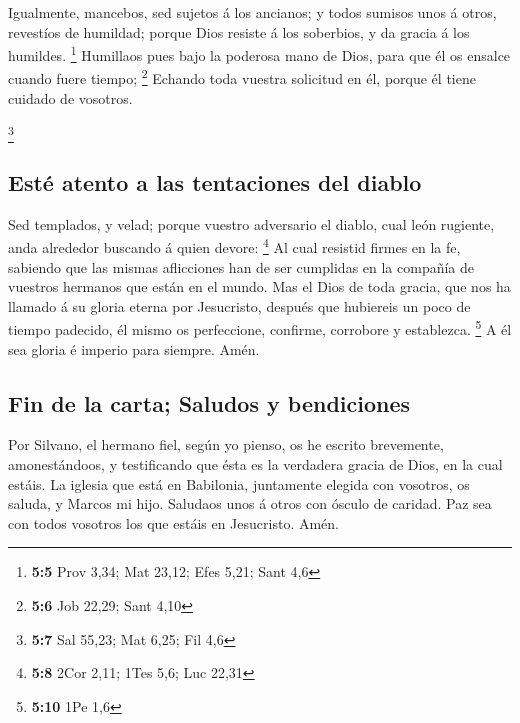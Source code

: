 Igualmente, mancebos, sed sujetos á los ancianos; y todos
sumisos unos á otros, revestíos de humildad; porque Dios resiste á los
soberbios, y da gracia á los humildes. \footnote{\textbf{5:5} Prov 3,34;
  Mat 23,12; Efes 5,21; Sant 4,6}  Humillaos pues bajo la
poderosa mano de Dios, para que él os ensalce cuando fuere tiempo;
\footnote{\textbf{5:6} Job 22,29; Sant 4,10}  Echando toda
vuestra solicitud en él, porque él tiene cuidado de vosotros.

\footnote{\textbf{5:7} Sal 55,23; Mat 6,25; Fil 4,6}

\hypertarget{estuxe9-atento-a-las-tentaciones-del-diablo}{%
\subsection{Esté atento a las tentaciones del
diablo}\label{estuxe9-atento-a-las-tentaciones-del-diablo}}

 Sed templados, y velad; porque vuestro adversario el
diablo, cual león rugiente, anda alrededor buscando á quien devore:
\footnote{\textbf{5:8} 2Cor 2,11; 1Tes 5,6; Luc 22,31}  Al
cual resistid firmes en la fe, sabiendo que las mismas aflicciones han
de ser cumplidas en la compañía de vuestros hermanos que están en el
mundo.  Mas el Dios de toda gracia, que nos ha llamado á
su gloria eterna por Jesucristo, después que hubiereis un poco de tiempo
padecido, él mismo os perfeccione, confirme, corrobore y establezca.
\footnote{\textbf{5:10} 1Pe 1,6}  A él sea gloria é
imperio para siempre. Amén.

\hypertarget{fin-de-la-carta-saludos-y-bendiciones}{%
\subsection{Fin de la carta; Saludos y
bendiciones}\label{fin-de-la-carta-saludos-y-bendiciones}}

 Por Silvano, el hermano fiel, según yo pienso, os he
escrito brevemente, amonestándoos, y testificando que ésta es la
verdadera gracia de Dios, en la cual estáis.  La iglesia
que está en Babilonia, juntamente elegida con vosotros, os saluda, y
Marcos mi hijo.  Saludaos unos á otros con ósculo de
caridad. Paz sea con todos vosotros los que estáis en Jesucristo. Amén.
